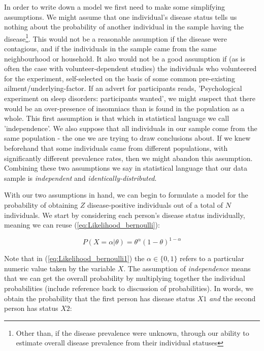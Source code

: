 \documentclass[11pt,fullpage]{book}
\begin{document}
In order to write down a model we first need to make some simplifying assumptions. We might assume that one individual's disease status tells us nothing about the probability of another individual in the sample having the disease\footnote{Other than, if the disease prevalence were unknown, through our ability to estimate overall disease prevalence from their individual statuses}. This would not be a reasonable assumption if the disease were contagious, and if the individuals in the sample came from the same neighbourhood or household. It also would not be a good assumption if (as is often the case with volunteer-dependent studies) the individuals who volunteered for the experiment, self-selected on the basis of some common pre-existing ailment/underlying-factor. If an advert for participants reads, 'Psychological experiment on sleep disorders: participants wanted', we might suspect that there would be an over-presence of insomniacs than is found in the population as a whole. This first assumption is that which in statistical language we call 'independence'. We also suppose that all individuals in our sample come from the same population - the one we are trying to draw conclusions about. If we knew beforehand that some individuals came from different populations, with significantly different prevalence rates, then we might abandon this assumption. Combining these two assumptions we say in statistical language that our data sample is \textit{independent} and \textit{identically-distributed}.

With our two assumptions in hand, we can begin to formulate a model for the probability of obtaining $Z$ disease-positive individuals out of a total of $N$ individuals. We start by considering each person's disease status individually, meaning we can reuse (\ref{eq:Likelihood_bernoulli}):

\begin{equation}\label{eq:Likelihood_bernoulli1}
P(X=\alpha|\theta) = \theta^\alpha(1-\theta)^{1-\alpha}
\end{equation}

Note that in (\ref{eq:Likelihood_bernoulli1}) the $\alpha\in\{0,1\}$ refers to a particular numeric value taken by the variable $X$. The assumption of \textit{independence} means that we can get the overall probability by multiplying together the individual probabilities (include reference back to discussion of probabilities). In words, we obtain the probability that the first person has disease status $X1$ \textit{and} the second person has status $X2$:
\end{document}
